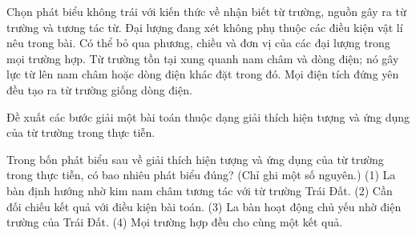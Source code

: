 \begin{ex}
Chọn phát biểu không trái với kiến thức về nhận biết từ trường, nguồn gây ra từ trường và tương tác từ.
\choice
{Đại lượng đang xét không phụ thuộc các điều kiện vật lí nêu trong bài.}
{Có thể bỏ qua phương, chiều và đơn vị của các đại lượng trong mọi trường hợp.}
{\True Từ trường tồn tại xung quanh nam châm và dòng điện; nó gây lực từ lên nam châm hoặc dòng điện khác đặt trong đó.}
{Mọi điện tích đứng yên đều tạo ra từ trường giống dòng điện.}
\end{ex}

\begin{bt}
Đề xuất các bước giải một bài toán thuộc dạng giải thích hiện tượng và ứng dụng của từ trường trong thực tiễn.
\end{bt}

\begin{ex}
Trong bốn phát biểu sau về giải thích hiện tượng và ứng dụng của từ trường trong thực tiễn, có bao nhiêu phát biểu đúng? (Chỉ ghi một số nguyên.) (1) La bàn định hướng nhờ kim nam châm tương tác với từ trường Trái Đất. (2) Cần đối chiếu kết quả với điều kiện bài toán. (3) La bàn hoạt động chủ yếu nhờ điện trường của Trái Đất. (4) Mọi trường hợp đều cho cùng một kết quả.
\end{ex}

